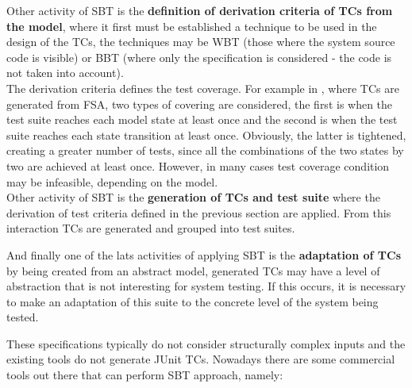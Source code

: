 {Other activity of \ac{SBT} is the
\textbf{definition of derivation criteria of \ac{TC}s from the model}, where it first must be established a technique to be used in the design of the \ac{TC}s,
the techniques may be \ac{WBT} (those where the system source code is visible) or \ac{BBT} (where only the specification is considered - the code is not taken into account).\\
The derivation criteria defines the test coverage. For example in \cite{Lindholm06model-basedtesting}, where \ac{TC}s are generated from \ac{FSA},
two types of covering are considered, the first is when the test suite reaches each model state at least once and the second
is when the test suite reaches each state transition at least once.
Obviously, the latter is tightened, creating a greater number of tests, since all the combinations of the two states by two
are achieved at least once. However, in many cases test coverage condition may be infeasible, depending on the model.\\

Other activity of \ac{SBT} is the
\textbf{generation of \ac{TC}s and test suite} where the derivation of test criteria defined in the previous section are applied.
From this interaction \ac{TC}s are generated and grouped into test suites.

And finally one of the lats activities of applying \ac{SBT} is the
\textbf{adaptation of \ac{TC}s} by being created from an abstract model, generated \ac{TC}s
may have a level of abstraction that is not interesting for system testing.
If this occurs, it is necessary to make an adaptation of this suite to the concrete level of the system being tested.
}
These specifications typically do not consider structurally complex inputs and the existing tools do not generate JUnit \ac{TC}s.
Nowadays there are some commercial tools out there that can perform \ac{SBT} approach, namely:
